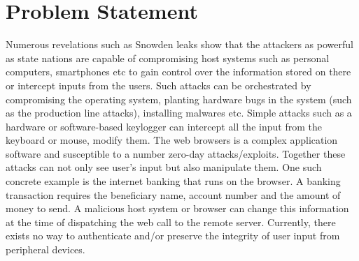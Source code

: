 \section{Problem Statement}
\label{sec:problemStatement}


% 
% 

Numerous revelations such as Snowden leaks show that the attackers as powerful as state nations are capable of compromising host systems such as personal computers, smartphones etc to gain control over the information stored on there or intercept inputs from the users. Such attacks can be orchestrated by compromising the operating system, planting hardware bugs in the system (such as the production line attacks), installing malwares etc. Simple attacks such as a hardware or software-based keylogger can intercept all the input from the keyboard or mouse, modify them. The web browsers is a complex application software and susceptible to a number zero-day attacks/exploits. Together these attacks can not only see user's input but also manipulate them. One such concrete example is the internet banking that runs on the browser. A banking transaction requires the beneficiary name, account number and the amount of money to send. A malicious host system or browser can change this information at the time of dispatching the web call to the remote server. Currently, there exists no way to authenticate and/or preserve the integrity of user input from peripheral devices. 


